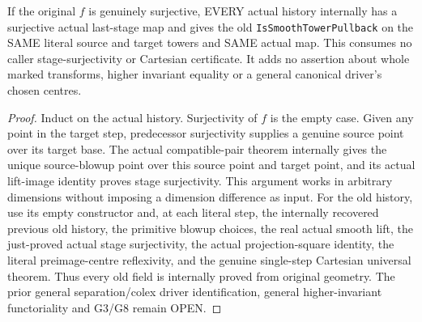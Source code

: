 \begin{theorem}
\label{hir:submersion-cartesian-tower-surjective-bridge}
\leanok
{}
If the original $f$ is genuinely surjective, EVERY actual history internally
has a surjective actual last-stage map and gives the old
\texttt{IsSmoothTowerPullback} on the SAME literal source and target towers
and SAME actual map. This consumes no caller stage-surjectivity or Cartesian
certificate. It adds no assertion about whole marked transforms, higher
invariant equality or a general canonical driver's chosen centres.
\end{theorem}
\begin{proof}
Induct on the actual history. Surjectivity of $f$ is the empty case. Given
any point in the target step, predecessor surjectivity supplies a genuine
source point over its target base. The actual compatible-pair theorem
internally gives the unique source-blowup point over this source point and
target point, and its actual lift-image identity proves stage surjectivity.
This argument works in arbitrary dimensions without imposing a dimension
difference as input. For the old history, use its empty constructor and,
at each literal step, the internally recovered previous old history,
the primitive blowup choices, the real actual smooth lift, the just-proved
actual stage surjectivity, the actual projection-square identity, the
literal preimage-centre reflexivity, and the genuine single-step Cartesian
universal theorem. Thus every old field is internally proved from original
geometry. The prior general separation/colex driver identification,
general higher-invariant functoriality and G3/G8 remain OPEN.
\end{proof}
